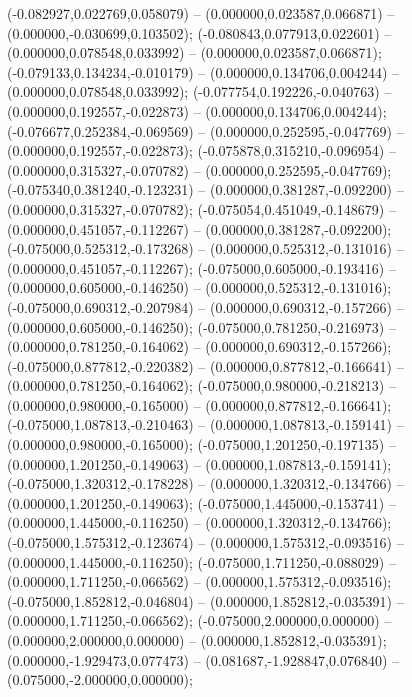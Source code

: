  (-0.082927,0.022769,0.058079) -- (0.000000,0.023587,0.066871) -- (0.000000,-0.030699,0.103502);
 (-0.080843,0.077913,0.022601) -- (0.000000,0.078548,0.033992) -- (0.000000,0.023587,0.066871);
 (-0.079133,0.134234,-0.010179) -- (0.000000,0.134706,0.004244) -- (0.000000,0.078548,0.033992);
 (-0.077754,0.192226,-0.040763) -- (0.000000,0.192557,-0.022873) -- (0.000000,0.134706,0.004244);
 (-0.076677,0.252384,-0.069569) -- (0.000000,0.252595,-0.047769) -- (0.000000,0.192557,-0.022873);
 (-0.075878,0.315210,-0.096954) -- (0.000000,0.315327,-0.070782) -- (0.000000,0.252595,-0.047769);
 (-0.075340,0.381240,-0.123231) -- (0.000000,0.381287,-0.092200) -- (0.000000,0.315327,-0.070782);
 (-0.075054,0.451049,-0.148679) -- (0.000000,0.451057,-0.112267) -- (0.000000,0.381287,-0.092200);
 (-0.075000,0.525312,-0.173268) -- (0.000000,0.525312,-0.131016) -- (0.000000,0.451057,-0.112267);
 (-0.075000,0.605000,-0.193416) -- (0.000000,0.605000,-0.146250) -- (0.000000,0.525312,-0.131016);
 (-0.075000,0.690312,-0.207984) -- (0.000000,0.690312,-0.157266) -- (0.000000,0.605000,-0.146250);
 (-0.075000,0.781250,-0.216973) -- (0.000000,0.781250,-0.164062) -- (0.000000,0.690312,-0.157266);
 (-0.075000,0.877812,-0.220382) -- (0.000000,0.877812,-0.166641) -- (0.000000,0.781250,-0.164062);
 (-0.075000,0.980000,-0.218213) -- (0.000000,0.980000,-0.165000) -- (0.000000,0.877812,-0.166641);
 (-0.075000,1.087813,-0.210463) -- (0.000000,1.087813,-0.159141) -- (0.000000,0.980000,-0.165000);
 (-0.075000,1.201250,-0.197135) -- (0.000000,1.201250,-0.149063) -- (0.000000,1.087813,-0.159141);
 (-0.075000,1.320312,-0.178228) -- (0.000000,1.320312,-0.134766) -- (0.000000,1.201250,-0.149063);
 (-0.075000,1.445000,-0.153741) -- (0.000000,1.445000,-0.116250) -- (0.000000,1.320312,-0.134766);
 (-0.075000,1.575312,-0.123674) -- (0.000000,1.575312,-0.093516) -- (0.000000,1.445000,-0.116250);
 (-0.075000,1.711250,-0.088029) -- (0.000000,1.711250,-0.066562) -- (0.000000,1.575312,-0.093516);
 (-0.075000,1.852812,-0.046804) -- (0.000000,1.852812,-0.035391) -- (0.000000,1.711250,-0.066562);
 (-0.075000,2.000000,0.000000) -- (0.000000,2.000000,0.000000) -- (0.000000,1.852812,-0.035391);
 (0.000000,-1.929473,0.077473) -- (0.081687,-1.928847,0.076840) -- (0.075000,-2.000000,0.000000);
